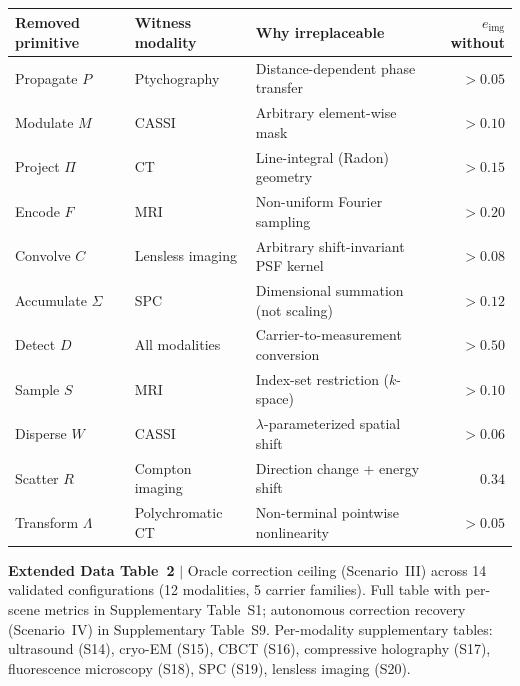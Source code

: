 \documentclass[11pt]{article}
\newcommand{\etier}{e_{\mathrm{img}}}
\begin{document}
\begin{center}
\small\setlength{\tabcolsep}{5pt}
\begin{tabular}{@{}lllr@{}}
\toprule
\textbf{Removed primitive} & \textbf{Witness modality} & \textbf{Why irreplaceable} & $\etier$ \textbf{without} \\
\midrule
Propagate $P$     & Ptychography         & Distance-dependent phase transfer    & $> 0.05$ \\
Modulate $M$      & CASSI                & Arbitrary element-wise mask          & $> 0.10$ \\
Project $\Pi$     & CT                   & Line-integral (Radon) geometry       & $> 0.15$ \\
Encode $F$        & MRI                  & Non-uniform Fourier sampling         & $> 0.20$ \\
Convolve $C$      & Lensless imaging     & Arbitrary shift-invariant PSF kernel & $> 0.08$ \\
Accumulate $\Sigma$ & SPC                & Dimensional summation (not scaling)  & $> 0.12$ \\
Detect $D$        & All modalities       & Carrier-to-measurement conversion    & $> 0.50$ \\
Sample $S$        & MRI                  & Index-set restriction ($k$-space)    & $> 0.10$ \\
Disperse $W$      & CASSI                & $\lambda$-parameterized spatial shift & $> 0.06$ \\
Scatter $R$       & Compton imaging      & Direction change + energy shift      & $0.34$  \\
Transform $\Lambda$ & Polychromatic CT   & Non-terminal pointwise nonlinearity  & $> 0.05$ \\
\bottomrule
\end{tabular}
\end{center}
\label{tab:necessity}

\vspace{12pt}

\noindent\textbf{Extended Data Table~2} $|$ Oracle correction ceiling (Scenario~III) across 14 validated configurations (12 modalities, 5 carrier families). Full table with per-scene metrics in Supplementary Table~S1; autonomous correction recovery (Scenario~IV) in Supplementary Table~S9. Per-modality supplementary tables: ultrasound (S14), cryo-EM (S15), CBCT (S16), compressive holography (S17), fluorescence microscopy (S18), SPC (S19), lensless imaging (S20).
\end{document}
